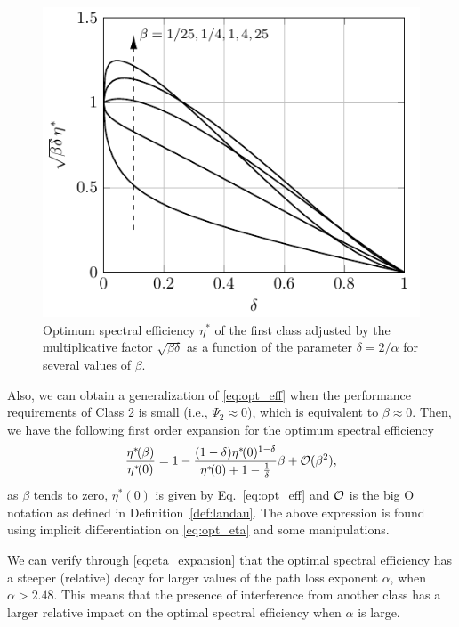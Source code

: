 \begin{figure}[!t]
	\centering
	\includegraphics[]{./Figures/Ch7_optimum_eta_delta.pdf}	
	\caption{Optimum spectral efficiency $\eta^*$ of the first class adjusted by the multiplicative factor $\sqrt{\beta\delta}$ as a function of the parameter $\delta = 2/\alpha$ for several values of $\beta$.}
	\label{fig:optimum_eta_delta}
\end{figure}

Also, we can obtain a generalization of \eqref{eq:opt_eff} when the performance requirements of Class 2 is small (i.e., $\Psi_2 \approx 0$), which is equivalent to $\beta \approx 0$. Then, we have the following first order expansion for the optimum spectral efficiency
\begin{align} \label{eq:eta_expansion}
    \frac{\eta^*\!(\beta)}{\eta^*\!(0)} = 1 - \frac{(1-\delta)\eta^*\!(0)^{1-\delta}}{\eta^*\!(0)+1-\frac{1}{\delta}} \beta + \cal{O}(\beta^2),
\end{align}
as $\beta$ tends to zero, $\eta^*\!(0)$ is given by Eq.~\eqref{eq:opt_eff} and $\cal{O}$ is the big O notation as defined in Definition~\ref{def:landau}.
%
The above expression is found using implicit differentiation on \eqref{eq:opt_eta} and some manipulations.

We can verify through \eqref{eq:eta_expansion} that the optimal spectral efficiency has a steeper (relative) decay for larger values of the path loss exponent $\alpha$, when $\alpha > 2.48$.
%
This means that the presence of interference from another class has a larger relative impact on the optimal spectral efficiency when $\alpha$ is large.

